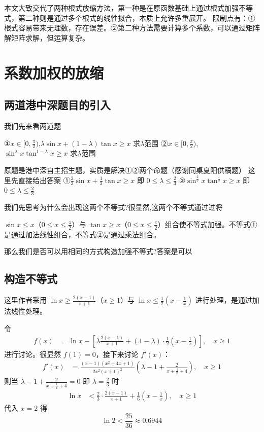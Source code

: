 \documentclass[12pt]{article}
\theoremstyle{definition}
\theoremstyle{plain}
\theoremstyle{definition}
\begin{document}
本文大致交代了两种根式放缩方法，第一种是在原函数基础上通过根式加强不等式，第二种则是通过多个根式的线性拟合，本质上允许多重展开。
限制点有：①根式容易带来无理数，存在误差。②第二种方法需要计算多个系数，可以通过矩阵解矩阵求解，但运算复杂。

\section{系数加权的放缩}

\subsection{两道港中深题目的引入}

我们先来看两道题

①\(x \in \lbrack 0,\frac{\pi}{2})\),\(\lambda\sin x + (1 - \lambda)\tan x \geq x\)
求\(\lambda\)范围
②\(x \in \lbrack 0,\frac{\pi}{2})\),\(\sin^{\lambda}x\tan^{1 - \lambda}x \geq x\)
求\(\lambda\)范围

原题是港中深自主招生题，实质是解决①②两个命题（感谢同桌夏阳供稿题）
这里先直接给出答案 ①\(\frac{2}{3}\sin x + \frac{1}{3}\tan x \geq x\) 即
\(0 \leq \lambda \leq \frac{2}{3}\)
②\(\sin^{\frac{2}{3}}x\tan^{\frac{1}{3}}x \geq x\) 即
\(0 \leq \lambda \leq \frac{2}{3}\)

我们先思考为什么会出现这两个不等式?很显然,这两个不等式通过过将

\(\sin x \leq x\)（\(0 \leq x \leq \frac{\pi}{2}\)）与 \(\tan x \geq x\)（\(0 \leq x \leq \frac{\pi}{2}\)）组合使不等式加强。不等式①是通过加法线性组合，不等式②是通过乘法组合。

那么我们是否可以用相同的方式构造加强不等式?答案是可以

\subsection{构造不等式}

这里作者采用 \(\ln x \geq \frac{2(x - 1)}{x + 1}\)（\(x \geq 1\)）与 \(\ln x \leq \frac{1}{2}\left( x - \frac{1}{x} \right)\) 进行处理，是通过加法线性处理。

令
\begin{align*}
f(x) &= \ln x - \left\lbrack \lambda\frac{2(x - 1)}{x + 1} + (1 - \lambda) \cdot \frac{1}{2}\left( x - \frac{1}{x} \right) \right\rbrack, \quad x \geq 1
\end{align*}
进行讨论。很显然 \(f(1) = 0\)，接下来讨论 \(f'(x)\)：
\begin{align*}
f'(x) &= \frac{(x - 1)\left( x^{2} + 4x + 1 \right)}{2x^{2}(x + 1)^{2}}\left( \lambda - 1 + \frac{2}{x + \frac{1}{x} + 4} \right), \quad x \geq 1
\end{align*}
则当 \(\lambda - 1 + \frac{2}{x + \frac{1}{x} + 4} = 0\) 即 \(\lambda = \frac{2}{3}\) 时
\begin{align*}
\ln x &< \frac{2}{3} \cdot \frac{2(x - 1)}{x + 1} + \frac{1}{6}\left( x - \frac{1}{x} \right), \quad x \geq 1
\end{align*}
代入 \(x = 2\) 得
\[\ln 2 < \frac{25}{36} \approx 0.6944\]
\end{document}
